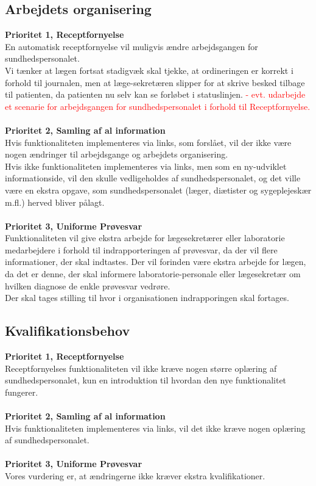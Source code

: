 \subsection{Arbejdets organisering}  
\textbf{Prioritet 1, Receptfornyelse} \\
En automatisk receptfornyelse vil muligvis ændre arbejdsgangen for sundhedspersonalet. \\ 
Vi tænker at lægen fortsat stadigvæk skal tjekke, at ordineringen er korrekt i forhold til journalen, men at læge-sekretæren slipper for at skrive besked tilbage til patienten, da patienten nu selv kan se forløbet i statuslinjen.
%
\textcolor{red}{ - evt. udarbejde et scenarie for arbejdsgangen for sundhedspersonalet i forhold til Receptfornyelse.}
\\\\
\textbf{Prioritet 2, Samling af al information} \\
Hvis funktionaliteten implementeres via links, som forslået, vil der ikke være nogen ændringer til arbejdsgange og arbejdets organisering. \\
Hvis ikke funktionaliteten implementeres via links, men som en ny-udviklet informationside, vil den skulle vedligeholdes af sundhedspersonalet, og det ville være en ekstra opgave, som sundhedspersonalet (læger, diætister og sygeplejeskær m.fl.) herved bliver pålagt.
\\\\
\textbf{Prioritet 3, Uniforme Prøvesvar} \\
Funktionaliteten vil give ekstra arbejde for lægesekretærer eller laboratorie medarbejdere i forhold til indrapporteringen af prøvesvar, da der vil flere informationer, der skal indtastes. Der vil forinden være ekstra arbejde for lægen, da det er denne, der skal informere laboratorie-personale eller lægesekretær om hvilken diagnose de enkle prøvesvar vedrøre.\\
Der skal tages stilling til hvor i organisationen indrapporingen skal fortages.
\subsection{Kvalifikationsbehov}
\textbf{Prioritet 1, Receptfornyelse} \\
  Receptfornyelses funktionaliteten vil ikke kræve nogen større oplæring af sundhedspersonalet, kun en introduktion til hvordan den nye funktionalitet fungerer.
  \\\\
  \textbf{Prioritet 2, Samling af al information} \\
  Hvis funktionaliteten implementeres via links, vil det ikke kræve nogen oplæring af sundhedspersonalet.
  \\\\
  \textbf{Prioritet 3, Uniforme Prøvesvar} \\
  Vores vurdering er, at ændringerne ikke kræver ekstra kvalifikationer.